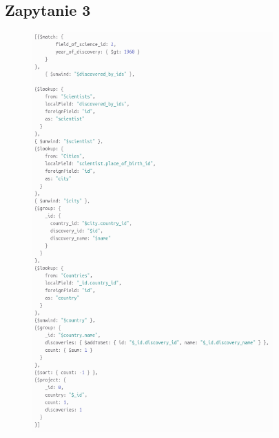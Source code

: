 \documentclass[11pt]{article}
\begin{document}
	\subsection{Zapytanie 3}
		\begin{figure}[!ht]
			\begin{center}
				\includegraphics[width=350px]{m3.png}
			\end{center}
		\end{figure}

\newpage
\end{document}
